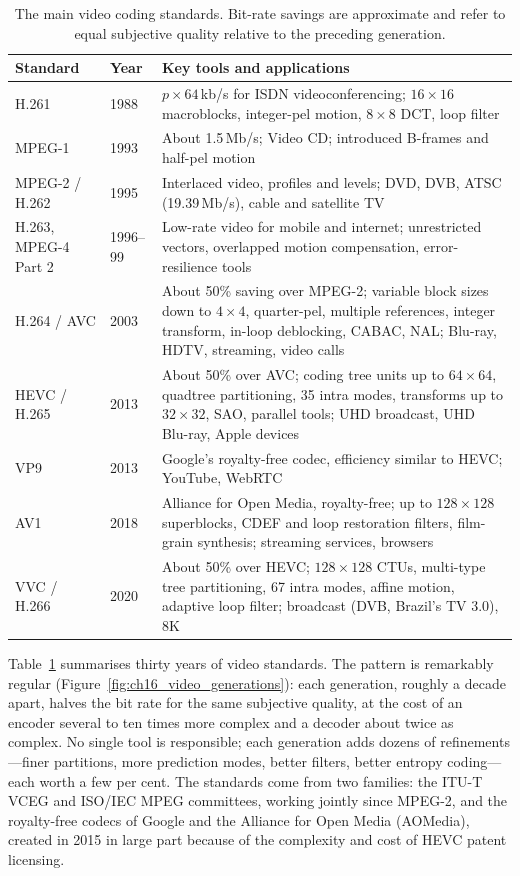 \begin{table}[htbp]\centering\small
\caption{The main video coding standards. Bit-rate savings are approximate and refer to equal subjective
quality relative to the preceding generation.}
\label{tab:ch16:video}
\begin{tabularx}{\linewidth}{@{}l l X@{}}
\toprule
Standard & Year & Key tools and applications\\
\midrule
H.261 & 1988 & $p\times64$\,kb/s for ISDN videoconferencing; $16\times16$ macroblocks, integer-pel
motion, $8\times8$ DCT, loop filter\\
MPEG-1 & 1993 & About 1.5\,Mb/s; Video CD; introduced B-frames and half-pel motion\\
MPEG-2 / H.262 & 1995 & Interlaced video, profiles and levels; DVD, DVB, ATSC (19.39\,Mb/s), cable and satellite TV\\
H.263, MPEG-4 Part 2 & 1996--99 & Low-rate video for mobile and internet; unrestricted vectors, overlapped
motion compensation, error-resilience tools\\
H.264 / AVC & 2003 & About 50\% saving over MPEG-2; variable block sizes down to $4\times4$, quarter-pel,
multiple references, integer transform, in-loop deblocking, CABAC, NAL; Blu-ray, HDTV, streaming, video calls\\
HEVC / H.265 & 2013 & About 50\% over AVC; coding tree units up to $64\times64$, quadtree partitioning, 35
intra modes, transforms up to $32\times32$, SAO, parallel tools; UHD broadcast, UHD Blu-ray, Apple devices\\
VP9 & 2013 & Google's royalty-free codec, efficiency similar to HEVC; YouTube, WebRTC\\
AV1 & 2018 & Alliance for Open Media, royalty-free; up to $128\times128$ superblocks, CDEF and loop restoration
filters, film-grain synthesis; streaming services, browsers\\
VVC / H.266 & 2020 & About 50\% over HEVC; $128\times128$ CTUs, multi-type tree partitioning, 67 intra modes,
affine motion, adaptive loop filter; broadcast (DVB, Brazil's TV 3.0), 8K\\
\bottomrule
\end{tabularx}
\end{table}

Table~\ref{tab:ch16:video} summarises thirty years of video standards. The pattern is remarkably
regular (Figure~\ref{fig:ch16_video_generations}): each generation, roughly a decade apart, halves the
bit rate for the same subjective quality, at the cost of an encoder several to ten times more complex
and a decoder about twice as complex. No single tool is responsible; each generation adds dozens of
refinements---finer partitions, more prediction modes, better filters, better entropy coding---each
worth a few per cent. The standards come from two families: the ITU-T VCEG and ISO/IEC MPEG
committees, working jointly since MPEG-2, and the royalty-free codecs of Google and the Alliance for
Open Media (AOMedia), created in 2015 in large part because of the complexity and cost of HEVC patent
licensing.

